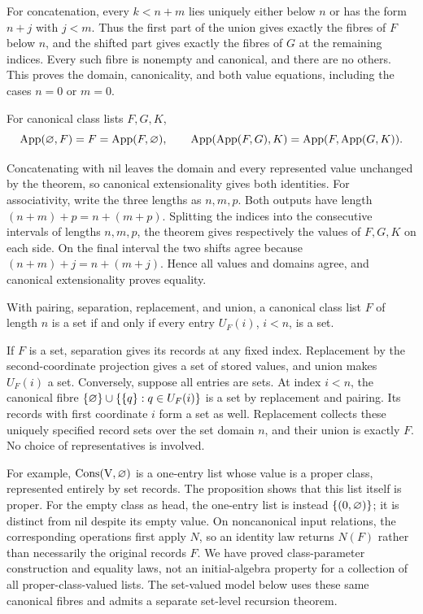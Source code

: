 For concatenation, every $k<n+m$ lies uniquely either below $n$ or
has the form $n+j$ with $j<m$. Thus the first part of the union gives
exactly the fibres of $F$ below $n$, and the shifted part gives exactly
the fibres of $G$ at the remaining indices. Every such fibre is
nonempty and canonical, and there are no others. This proves the domain,
canonicality, and both value equations, including the cases $n=0$ or
$m=0$.
\Done

\begin{corollary}
For canonical class lists $F,G,K$,
\[
\operatorname{App}(\varnothing,F)=F
 =\operatorname{App}(F,\varnothing),\qquad
\operatorname{App}(\operatorname{App}(F,G),K)
 =\operatorname{App}(F,\operatorname{App}(G,K)).
\]
\end{corollary}
\Proof
Concatenating with nil leaves the domain and every represented value
unchanged by the theorem, so canonical extensionality gives both
identities. For associativity, write the three lengths as $n,m,p$.
Both outputs have length $(n+m)+p=n+(m+p)$. Splitting the indices
into the consecutive intervals of lengths $n,m,p$, the theorem gives
respectively the values of $F,G,K$ on each side. On the final interval
the two shifts agree because $(n+m)+j=n+(m+j)$. Hence all values and
domains agree, and canonical extensionality proves equality.
\Done

\begin{proposition}
With pairing, separation, replacement, and union, a canonical class list $F$
of length $n$ is a set if and only if every entry $U_F(i)$, $i<n$,
is a set.
\end{proposition}
\Proof
If $F$ is a set, separation gives its records at any fixed index.
Replacement by the second-coordinate projection gives a set of stored
values, and union makes $U_F(i)$ a set.
Conversely, suppose all entries are sets. At index $i<n$, the canonical
fibre $\{\varnothing\}\cup\{\{q\}:q\in U_F(i)\}$ is a set by
replacement and pairing. Its records with first coordinate $i$ form a
set as well. Replacement collects these uniquely specified record sets
over the set domain $n$, and their union is exactly $F$. No choice of
representatives is involved.
\Done

For example, $\operatorname{Cons}(\mathrm{V},\varnothing)$ is a one-entry
list whose value is a proper class, represented entirely by set records.
The proposition shows that this list itself is proper.
For the empty class as head, the one-entry list is instead
$\{(0,\varnothing)\}$; it is distinct from nil despite its empty value.
On noncanonical input relations, the corresponding operations first
apply $N$, so an identity law returns $N(F)$ rather than necessarily
the original records $F$. We have proved class-parameter construction
and equality laws, not an initial-algebra property for a collection of
all proper-class-valued lists. The set-valued model below uses these
same canonical fibres and admits a separate set-level recursion theorem.

